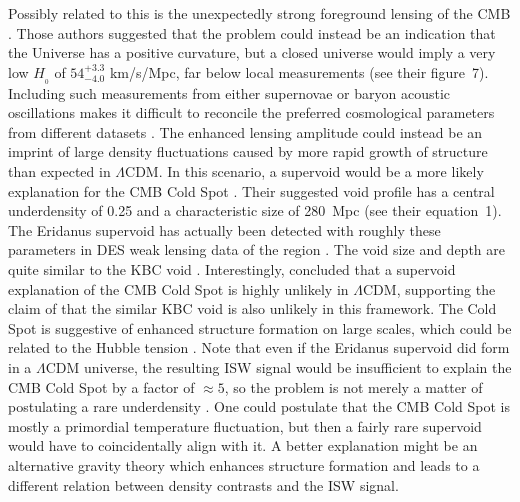 \documentclass[fleqn,usenatbib,useAMS,onecolumn]{mnras} %
\begin{document}
Possibly related to this is the unexpectedly strong foreground lensing of the CMB \citep*{Valentino_2020_flat}. Those authors suggested that the problem could instead be an indication that the Universe has a positive curvature, but a closed universe would imply a very low $H_{_0}$ of $54^{+3.3}_{-4.0}$ km/s/Mpc, far below local measurements (see their figure~7). Including such measurements from either supernovae or baryon acoustic oscillations makes it difficult to reconcile the preferred cosmological parameters from different datasets \citep{Handley_2021}. The enhanced lensing amplitude could instead be an imprint of large density fluctuations caused by more rapid growth of structure than expected in $\Lambda$CDM. In this scenario, a supervoid would be a more likely explanation for the CMB Cold Spot \citep{Nadathur_2014}. Their suggested void profile has a central underdensity of 0.25 and a characteristic size of 280~Mpc (see their equation~1). The Eridanus supervoid has actually been detected with roughly these parameters in DES weak lensing data of the region \citep{Kovacs_2022_Cold_Spot}. The void size and depth are quite similar to the KBC void \citep{Haslbauer_2020}. Interestingly, \citet{Nadathur_2014} concluded that a supervoid explanation of the CMB Cold Spot is highly unlikely in $\Lambda$CDM, supporting the claim of \citet{Haslbauer_2020} that the similar KBC void is also unlikely in this framework. The Cold Spot is suggestive of enhanced structure formation on large scales, which could be related to the Hubble tension \citep{Kovacs_2020}. Note that even if the Eridanus supervoid did form in a $\Lambda$CDM universe, the resulting ISW signal would be insufficient to explain the CMB Cold Spot by a factor of $\approx 5$, so the problem is not merely a matter of postulating a rare underdensity \citep{Kovacs_2022_Cold_Spot}. One could postulate that the CMB Cold Spot is mostly a primordial temperature fluctuation, but then a fairly rare supervoid would have to coincidentally align with it. A better explanation might be an alternative gravity theory which enhances structure formation and leads to a different relation between density contrasts and the ISW signal.
\end{document}
